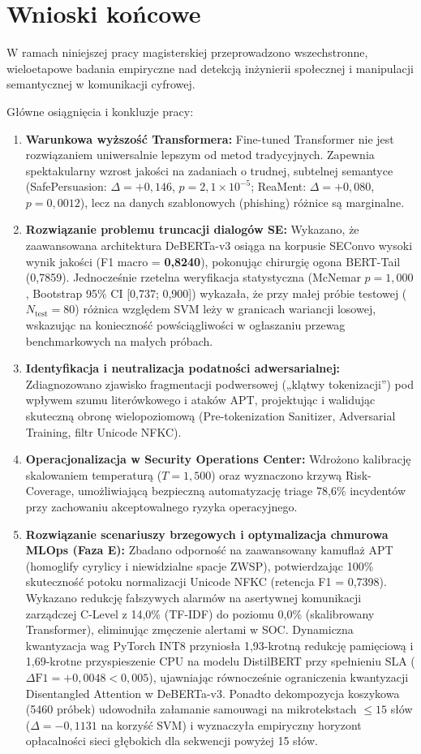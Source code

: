 \documentclass[12pt,a4paper,twoside]{report}
\begin{document}
\chapter{Wnioski końcowe}\label{ch:conclusions}
W ramach niniejszej pracy magisterskiej przeprowadzono wszechstronne, wieloetapowe badania empiryczne nad detekcją inżynierii społecznej i manipulacji semantycznej w komunikacji cyfrowej.

Główne osiągnięcia i konkluzje pracy:
\begin{enumerate}[leftmargin=*]
  \item \textbf{Warunkowa wyższość Transformera:} Fine-tuned Transformer nie jest rozwiązaniem uniwersalnie lepszym od metod tradycyjnych. Zapewnia spektakularny wzrost jakości na zadaniach o trudnej, subtelnej semantyce (SafePersuasion: $\Delta = +0,146$, $p = 2,1 \times 10^{-5}$; ReaMent: $\Delta = +0,080$, $p = 0,0012$), lecz na danych szablonowych (phishing) różnice są marginalne.
  \item \textbf{Rozwiązanie problemu truncacji dialogów SE:} Wykazano, że zaawansowana architektura DeBERTa-v3 osiąga na korpusie SEConvo wysoki wynik jakości (F1 macro = \textbf{0,8240}), pokonując chirurgię ogona BERT-Tail (0,7859). Jednocześnie rzetelna weryfikacja statystyczna (McNemar $p = 1,000$, Bootstrap 95\% CI [0,737; 0,900]) wykazała, że przy małej próbie testowej ($N_{\text{test}}=80$) różnica względem SVM leży w granicach wariancji losowej, wskazując na konieczność powściągliwości w ogłaszaniu przewag benchmarkowych na małych próbach.
  \item \textbf{Identyfikacja i neutralizacja podatności adwersarialnej:} Zdiagnozowano zjawisko fragmentacji podwersowej („klątwy tokenizacji”) pod wpływem szumu literówkowego i ataków APT, projektując i walidując skuteczną obronę wielopoziomową (Pre-tokenization Sanitizer, Adversarial Training, filtr Unicode NFKC).
  \item \textbf{Operacjonalizacja w Security Operations Center:} Wdrożono kalibrację skalowaniem temperaturą ($T=1,500$) oraz wyznaczono krzywą Risk-Coverage, umożliwiającą bezpieczną automatyzację triage 78,6\% incydentów przy zachowaniu akceptowalnego ryzyka operacyjnego.
  \item \textbf{Rozwiązanie scenariuszy brzegowych i optymalizacja chmurowa MLOps (Faza E):} Zbadano odporność na zaawansowany kamuflaż APT (homoglify cyrylicy i niewidzialne spacje ZWSP), potwierdzając 100\% skuteczność potoku normalizacji Unicode NFKC (retencja F1 = 0,7398). Wykazano redukcję fałszywych alarmów na asertywnej komunikacji zarządczej C-Level z 14,0\% (TF-IDF) do poziomu 0,0\% (skalibrowany Transformer), eliminując zmęczenie alertami w SOC. Dynamiczna kwantyzacja wag PyTorch INT8 przyniosła 1,93-krotną redukcję pamięciową i 1,69-krotne przyspieszenie CPU na modelu DistilBERT przy spełnieniu SLA ($\Delta\text{F1} = +0,0048 < 0,005$), ujawniając równocześnie ograniczenia kwantyzacji Disentangled Attention w DeBERTa-v3. Ponadto dekompozycja koszykowa (5460 próbek) udowodniła załamanie samouwagi na mikrotekstach $\le 15$ słów ($\Delta = -0,1131$ na korzyść SVM) i wyznaczyła empiryczny horyzont opłacalności sieci głębokich dla sekwencji powyżej 15 słów.

\end{enumerate}
\end{document}

